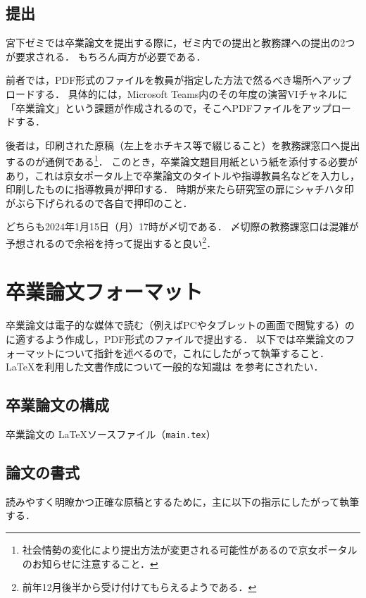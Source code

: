 \documentclass[a4paper,twocolumn,10pt]{ltjsarticle}
\begin{document}
\subsection{提出}

宮下ゼミでは卒業論文を提出する際に，ゼミ内での提出と教務課への提出の2つが要求される．
もちろん両方が必要である．

前者では，PDF形式のファイルを教員が指定した方法で然るべき場所へアップロードする．
具体的には，Microsoft Teams内のその年度の演習VIチャネルに「卒業論文」という課題が作成されるので，そこへPDFファイルをアップロードする．

後者は，印刷された原稿（左上をホチキス等で綴じること）を教務課窓口へ提出するのが通例である\footnote{社会情勢の変化により提出方法が変更される可能性があるので京女ポータルのお知らせに注意すること．}．
このとき，卒業論文題目用紙という紙を添付する必要があり，これは京女ポータル上で卒業論文のタイトルや指導教員名などを入力し，印刷したものに指導教員が押印する．
時期が来たら研究室の扉にシャチハタ印がぶら下げられるので各自で押印のこと．

どちらも2024年1月15日（月）17時が〆切である．
〆切際の教務課窓口は混雑が予想されるので余裕を持って提出すると良い\footnote{前年12月後半から受け付けてもらえるようである．}．

\section{卒業論文フォーマット}
\label{sec:format}

卒業論文は電子的な媒体で読む（例えばPCやタブレットの画面で閲覧する）のに適するよう作成し，PDF形式のファイルで提出する．
以下では卒業論文のフォーマットについて指針を述べるので，これにしたがって執筆すること．
\LaTeX を利用した文書作成について一般的な知識は \cite{okumura2020} を参考にされたい．

\subsection{卒業論文の構成}

卒業論文の \LaTeX ソースファイル（{\tt main.tex}）


\subsection{論文の書式}

読みやすく明瞭かつ正確な原稿とするために，主に以下の指示にしたがって執筆する．
\end{document}
